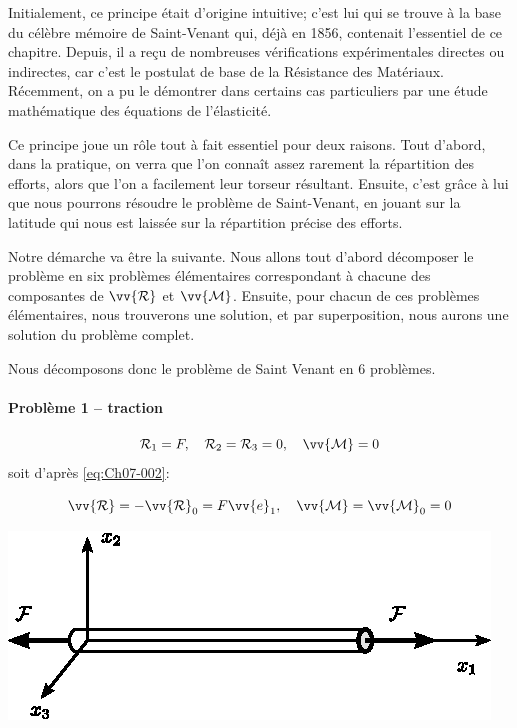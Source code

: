 Initialement, ce principe était d'origine intuitive; c'est lui qui se trouve à la base du célèbre mémoire de Saint-Venant qui, déjà en 1856, contenait l'essentiel de ce chapitre.
Depuis, il a reçu de nombreuses vérifications expérimentales directes ou indirectes, car c'est le postulat de base de la Résistance des Matériaux.
Récemment, on a pu le démontrer dans certains cas particuliers par une étude mathématique des équations de l'élasticité.

Ce principe joue un rôle tout à fait essentiel pour deux raisons.
Tout d'abord, dans la pratique, on verra que l'on connaît assez rarement la répartition des efforts, alors que l'on a facilement leur torseur résultant.
Ensuite, c'est grâce à lui que nous pourrons résoudre le problème de Saint-Venant, en jouant sur la latitude qui nous est laissée sur la répartition précise des efforts.

Notre démarche va être la suivante.
Nous allons tout d'abord décomposer le problème en six problèmes élémentaires correspondant à chacune des composantes de $\vv{\mathcal{R}}$ et $\vv{\mathcal{M}}$.
Ensuite, pour chacun de ces problèmes élémentaires, nous trouverons une solution, et par superposition, nous aurons une solution du problème complet.

Nous décomposons donc le problème de Saint Venant en 6 problèmes.
\paragraph{Problème 1 -- traction}
\begin{equation}
    \mathcal{R}_1 = F, \quad \mathcal{R}_2 = \mathcal{R}_3 = 0, \quad \vv{\mathcal{M}} = 0
    \label{eq:Ch07-009}
\end{equation}
soit d'après \eqref{eq:Ch07-002}:
\begin{multicols}{2}
    \begin{equation*}
        \vv{\mathcal{R}} = -\vv{\mathcal{R}}_0 = F \vv{e}_1, \quad \vv{\mathcal{M}} = \vv{\mathcal{M}}_0 = 0
    \end{equation*}
    \columnbreak
    \begin{center}
        \includegraphics{../images/T1_Ch07-02}
    \end{center}
\end{multicols}
